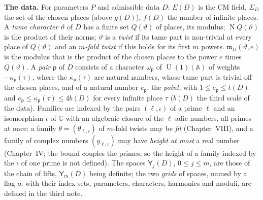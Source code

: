 \documentclass[11pt,a4paper]{article}
\newcommand{\kw}[1]{\emph{#1}}
\newcommand{\subhead}[1]{\par\addvspace{9pt plus 2pt}\Needspace{4\baselineskip}\noindent\textbf{#1}\enspace\ignorespaces}
\theoremstyle{plainx}
\theoremstyle{uprightx}
\newcommand{\sY}{\mathsf{Y}}
\newcommand{\pp}{\mathsf{p}}
\newcommand{\fm}{\mathfrak{m}}
\newcommand{\A}{\mathbb{A}}
\newcommand{\CC}{\mathbb{C}}
\newcommand{\U}{\operatorname{U}}
\newcommand{\Np}{\operatorname{N}}
\begin{document}
\subhead{The data.} For parameters $P$ and admissible data $D$: $E(D)$ is the CM field, $\Sigma_D$ the set of the
chosen places (above $g(D)$), $f(D)$ the number of infinite places. A \kw{tame character} $\vartheta$ of $D$ has a
finite set $Q(\vartheta)$ of places, its modulus; $\Np Q(\vartheta)$ is the product of their norms; $\vartheta$
is a \kw{twist} if its tame part is non-trivial at every place of $Q(\vartheta)$ and an \kw{$m$-fold twist} if
this holds for its first $m$ powers. $\fm_D(\vartheta,e)$ is the modulus that is the product of the chosen places
to the power $e$ times $Q(\vartheta)$. A \kw{pair} $\pp$ of $D$ consists of a character $\omega_{\pp}$ of
$\U(1)(\A)$ of weights $-\kappa_{\pp}(\tau)$, where the $\kappa_{\pp}(\tau)$ are natural numbers, whose tame part is
trivial off the chosen places, and of a natural number $e_{\pp}$, the \kw{point}, with $1\le e_{\pp}\le t(D)$ and
$e_{\pp}\le\kappa_{\pp}(\tau)\le4b(D)$ for every infinite place $\tau$ ($b(D)$ the third scale of the data). Families are
indexed by the pairs $(\ell,\iota)$ of a prime $\ell$ and an isomorphism $\iota$ of $\CC$ with an algebraic
closure of the $\ell$-adic numbers, all primes at once: a family $\theta=(\theta_{\ell,\iota})$ of $m$-fold twists
may be \kw{fit} (Chapter~VIII), and a family of complex numbers $(y_{\ell,\iota})$ may have \kw{height at most} a
real number (Chapter~IV; the bound couples the primes, so the height of a family indexed by the $\iota$ of one
prime is not defined). The spaces $\sY_{j}(D)$, $0\le j\le m$, are
those of the chain of lifts, $\sY_m(D)$ being definite; the two \kw{grids} of spaces, named by a flag $o$, with
their index sets, parameters, characters, harmonics and moduli, are defined in the third note.
\end{document}
